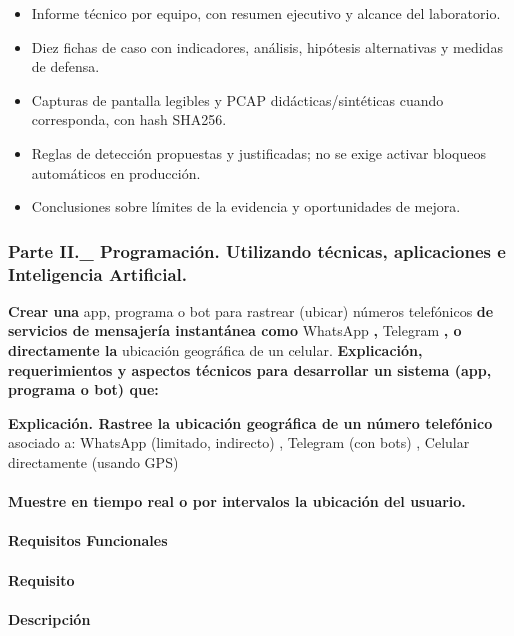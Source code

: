 \begin{itemize}
  \item Informe técnico por equipo, con resumen ejecutivo y alcance del laboratorio.
  \item Diez fichas de caso con indicadores, análisis, hipótesis alternativas y medidas de defensa.
  \item Capturas de pantalla legibles y PCAP didácticas/sintéticas cuando corresponda, con hash SHA256.
  \item Reglas de detección propuestas y justificadas; no se exige activar bloqueos automáticos en producción.
  \item Conclusiones sobre límites de la evidencia y oportunidades de mejora.
\end{itemize}

\subsubsection{Parte II.\_ Programación.  Utilizando técnicas, aplicaciones e Inteligencia Artificial.}

\textbf{Crear una} app, programa o bot para rastrear (ubicar) números telefónicos \textbf{de servicios de mensajería instantánea como} WhatsApp \textbf{,} Telegram \textbf{, o directamente la} ubicación geográfica de un celular. \textbf{Explicación, requerimientos y aspectos técnicos para desarrollar un sistema (app, programa o bot) que:}

\textbf{Explicación. Rastree la ubicación geográfica de un número telefónico} asociado a: WhatsApp (limitado, indirecto) , Telegram (con bots) , Celular directamente (usando GPS)

\paragraph{Muestre en tiempo real o por intervalos la ubicación del usuario.}

\paragraph{Requisitos Funcionales}

\paragraph{Requisito}

\paragraph{Descripción}

